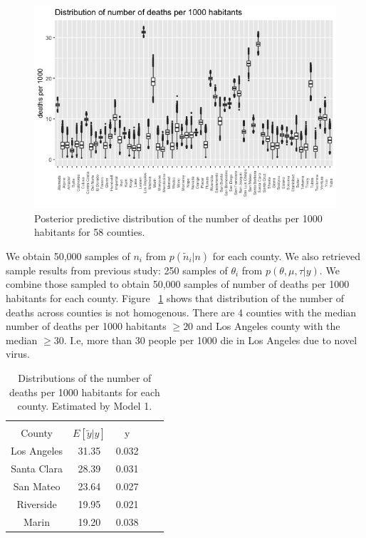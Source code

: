 \documentclass[11pt,twocolumn]{asaproc}
\begin{document}
\begin{figure}[t]
\centering\includegraphics[scale=.30]{deaths1.jpeg}
\caption{Posterior predictive distribution of the number of deaths per 1000 habitants for 58 counties. }
\label{fig:deaths1}
\end{figure}

We obtain 50,000 samples of $n_i$ from $p(\tilde{n}_i | n)$ for each county. We also retrieved sample results from previous study: 250 samples of $\theta_i$ from $p(\theta, \mu, \tau | y)$. We combine those sampled to obtain 50,000 samples of number of deaths  per 1000 habitants for each county. Figure ~\ref{fig:deaths1} shows that distribution of the number of deaths across counties is not homogenous. There are 4 counties with the median number of deaths per 1000 habitants $\geq 20$ and Los Angeles county with the median $\geq 30$. I.e, more than 30 people per 1000 die in Los Angeles due to novel virus.

\begin{table}
\label{table:deaths}
\caption{Distributions of the number of deaths per 1000 habitants for each county. Estimated by Model 1.}
\begin{center}
\begin{tabular}{ccccc}
\hline
\hline
\\[-5pt]
\multicolumn{1}{c}{County} &
\multicolumn{1}{c}{$E[\tilde{y}|y]$} &
\multicolumn{1}{c}{y}\\
\hline
Los Angeles&	31.35&	0.032\\
Santa Clara&     28.39&	 0.031\\
San Mateo&	23.64&	0.027\\
Riverside&     19.95& 0.021\\
Marin&     19.20&	0.038\\
\hline
\end{tabular}
\end{center}
\end{table}
\end{document}
